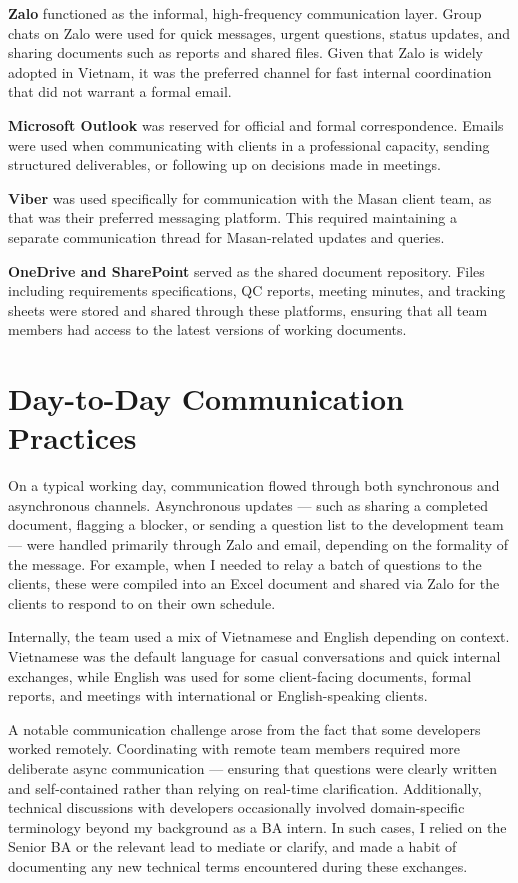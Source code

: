 \textbf{Zalo} functioned as the informal, high-frequency communication layer. Group chats on Zalo were used for quick messages, urgent questions, status updates, and sharing documents such as reports and shared files. Given that Zalo is widely adopted in Vietnam, it was the preferred channel for fast internal coordination that did not warrant a formal email.

\textbf{Microsoft Outlook} was reserved for official and formal correspondence. Emails were used when communicating with clients in a professional capacity, sending structured deliverables, or following up on decisions made in meetings.

\textbf{Viber} was used specifically for communication with the Masan client team, as that was their preferred messaging platform. This required maintaining a separate communication thread for Masan-related updates and queries.

\textbf{OneDrive and SharePoint} served as the shared document repository. Files including requirements specifications, QC reports, meeting minutes, and tracking sheets were stored and shared through these platforms, ensuring that all team members had access to the latest versions of working documents.

\section{Day-to-Day Communication Practices}

On a typical working day, communication flowed through both synchronous and asynchronous channels. Asynchronous updates — such as sharing a completed document, flagging a blocker, or sending a question list to the development team — were handled primarily through Zalo and email, depending on the formality of the message. For example, when I needed to relay a batch of questions to the clients, these were compiled into an Excel document and shared via Zalo for the clients to respond to on their own schedule.

Internally, the team used a mix of Vietnamese and English depending on context. Vietnamese was the default language for casual conversations and quick internal exchanges, while English was used for some client-facing documents, formal reports, and meetings with international or English-speaking clients.

A notable communication challenge arose from the fact that some developers worked remotely. Coordinating with remote team members required more deliberate async communication — ensuring that questions were clearly written and self-contained rather than relying on real-time clarification. Additionally, technical discussions with developers occasionally involved domain-specific terminology beyond my background as a BA intern. In such cases, I relied on the Senior BA or the relevant lead to mediate or clarify, and made a habit of documenting any new technical terms encountered during these exchanges.

